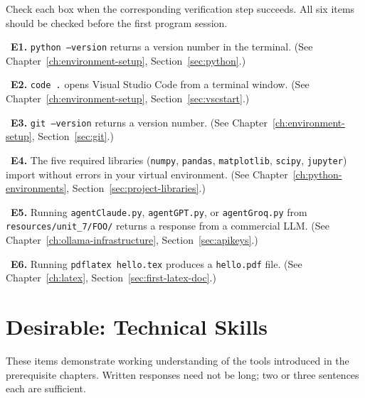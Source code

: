 \begin{Form}
Check each box when the corresponding verification step succeeds.
All six items should be checked before the first program session.

\vs

\noindent\CheckBox[name=e1,width=0.4cm,height=0.4cm]{}~\textbf{E1.}
\texttt{python --version} returns a version number in the terminal.
(See Chapter~\ref{ch:environment-setup}, Section~\ref{sec:python}.)

\vs

\noindent\CheckBox[name=e2,width=0.4cm,height=0.4cm]{}~\textbf{E2.}
\texttt{code .} opens Visual Studio Code from a terminal window.
(See Chapter~\ref{ch:environment-setup}, Section~\ref{sec:vscstart}.)

\vs

\noindent\CheckBox[name=e3,width=0.4cm,height=0.4cm]{}~\textbf{E3.}
\texttt{git --version} returns a version number.
(See Chapter~\ref{ch:environment-setup}, Section~\ref{sec:git}.)

\vs

\noindent\CheckBox[name=e4,width=0.4cm,height=0.4cm]{}~\textbf{E4.}
The five required libraries (\texttt{numpy}, \texttt{pandas},
\texttt{matplotlib}, \texttt{scipy}, \texttt{jupyter}) import
without errors in your virtual environment.
(See Chapter~\ref{ch:python-environments},
Section~\ref{sec:project-libraries}.)

\vs

\noindent\CheckBox[name=e5,width=0.4cm,height=0.4cm]{}~\textbf{E5.}
Running \texttt{agentClaude.py}, \texttt{agentGPT.py}, or
\texttt{agentGroq.py} from \texttt{resources/unit\_7/FOO/} returns
a response from a commercial LLM.
(See Chapter~\ref{ch:ollama-infrastructure},
Section~\ref{sec:apikeys}.)

\vs

\noindent\CheckBox[name=e6,width=0.4cm,height=0.4cm]{}~\textbf{E6.}
Running \texttt{pdflatex hello.tex} produces a \texttt{hello.pdf}
file.
(See Chapter~\ref{ch:latex}, Section~\ref{sec:first-latex-doc}.)

\section{Desirable: Technical Skills}
\label{sec:assess-desirable}

These items demonstrate working understanding of the tools introduced
in the prerequisite chapters. Written responses need not be long;
two or three sentences each are sufficient.


\end{Form}
